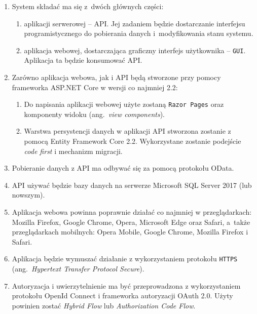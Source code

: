 \begin{enumerate}[labelwidth=1em,label=\arabic*.]

\item System składać ma się z~dwóch głównych części:
\begin{enumerate}[label=\alph*)]
\item aplikacji serwerowej -- API. Jej zadaniem będzie dostarczanie interfejsu programistycznego do pobierania danych i~modyfikowania stanu systemu.
\item aplikacja webowej, dostarczająca graficzny interfejs użytkownika -- \texttt{GUI}. Aplikacja ta będzie konsumować API.
\end{enumerate}

\item Zarówno aplikacja webowa, jak i API będą stworzone przy pomocy frameworka ASP.NET Core w wersji co najmniej 2.2: 
\begin{enumerate}[label=\alph*)]
\item Do napisania aplikacji webowej użyte zostaną \texttt{Razor Pages} oraz komponenty widoku (ang.~\emph{view components}). 
\item Warstwa persystencji danych w aplikacji API stworzona zostanie z pomocą Entity Framework Core 2.2. Wykorzystane zostanie podejście \emph{code first} i mechanizm migracji.
\end{enumerate}

\item Pobieranie danych z API ma odbywać się za pomocą protokołu OData.

\item API używać będzie bazy danych na serwerze Microsoft SQL Server 2017 (lub nowszym).

\item Aplikacja webowa powinna poprawnie działać co najmniej w przeglądarkach: Mozilla Firefox, Google Chrome, Opera, Microsoft Edge oraz Safari, a~także przeglądarkach mobilnych: Opera Mobile, Google Chrome, Mozilla Firefox i Safari.

\item Aplikacja będzie wymuszać działanie z wykorzystaniem protokołu \texttt{HTTPS} (ang.~\emph{Hypertext Transfer Protocol Secure}).

\item Autoryzacja i uwierzytelnienie ma być przeprowadzona z wykorzystaniem protokołu OpenId Connect i frameworka autoryzacji OAuth 2.0. Użyty powinien zostać \emph{Hybrid Flow} lub \emph{Authorization Code Flow}.


\end{enumerate}
